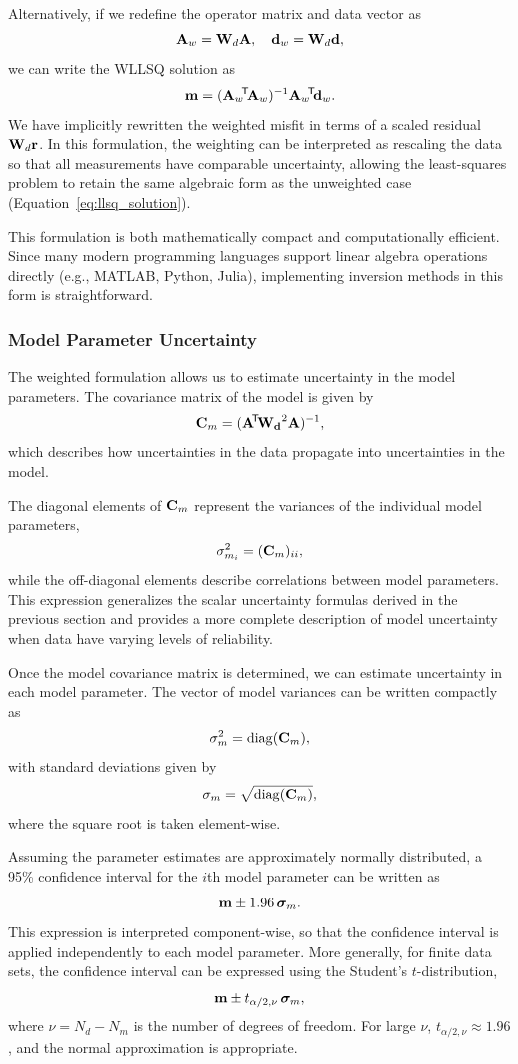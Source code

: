 Alternatively, if we redefine the operator matrix and data vector as
\[
    \vb{A}_w = \vb{W}_d \vb{A}, \quad \vb{d}_w = \vb{W}_d \vb{d} ,
\]
we can write the WLLSQ solution as
\[
    \vb{m} = (\vb{A}_w\!^\mathsf{T}\! \vb{A}_w)^{-1} \vb{A}_w\!^\mathsf{T}\! \vb{d}_w .
\]
We have implicitly rewritten the weighted misfit in terms of a scaled residual $\vb{W}_d \vb{r}$. In this formulation, the weighting can be interpreted as rescaling the data so that all measurements have comparable uncertainty, allowing the least-squares problem to retain the same algebraic form as the unweighted case (Equation~\ref{eq:llsq_solution}).

This formulation is both mathematically compact and computationally efficient. Since many modern programming languages support linear algebra operations directly (e.g., MATLAB, Python, Julia), implementing inversion methods in this form is straightforward.

\subsubsection{Model Parameter Uncertainty}

The weighted formulation allows us to estimate uncertainty in the model parameters. The covariance matrix of the model is given by
\begin{equation}
    \vb{C}_m = (\vb{A}\!^\mathsf{T}\! \vb{W_d}^2 \vb{A})^{-1},
\end{equation}
which describes how uncertainties in the data propagate into uncertainties in the model.

The diagonal elements of $\vb{C}_m$ represent the variances of the individual model parameters,
\[
    \sigma_{m_i}^2 = (\vb{C}_m)_{ii},
\]
while the off-diagonal elements describe correlations between model parameters.  This expression generalizes the scalar uncertainty formulas derived in the previous section and provides a more complete description of model uncertainty when data have varying levels of reliability.

Once the model covariance matrix is determined, we can estimate uncertainty in each model parameter. The vector of model variances can be written compactly as
\[
    \vb{\sigma}_m^2 = \operatorname{diag} (\vb{C}_m),
\]
with standard deviations given by
\[
    \vb{\sigma}_m = \sqrt{\operatorname{diag}(\vb{C}_m)},
\]
where the square root is taken element-wise.

Assuming the parameter estimates are approximately normally distributed, a 95\% confidence interval for the $i$th model parameter can be written as
\[
    \vb{m} \pm 1.96\,\bm{\sigma}_m.
\]
This expression is interpreted component-wise, so that the confidence interval is applied independently to each model parameter.  More generally, for finite data sets, the confidence interval can be expressed using the Student's $t$-distribution,
\[
    \vb{m} \pm t_{\alpha/2,\nu} \,\bm{\sigma}_m,
\]
where $\nu = N_d - N_m$ is the number of degrees of freedom. For large $\nu$, $t_{\alpha/2,\nu} \approx 1.96$, and the normal approximation is appropriate.

